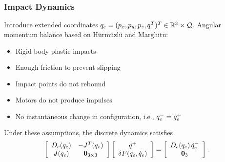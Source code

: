 \begin{frame}
  \frametitle{Impact Dynamics}
  Introduce extended coordinates $q_{e} = (p_{x}, p_{y}, p_{z}, q^{T})^{T} \in \mathbb{R}^{3} \times \mathcal{Q}$. Angular momentum balance based on H{\"u}rm{\"u}zl{\"u} and Marghitu:
  \begin{massump}
    \begin{itemize}
    \item Rigid-body plastic impacts
    \item Enough friction to prevent slipping
    \item Impact points do not rebound
    \item Motors do not produce impulses
    \item No instantaneous change in configuration, i.e., $q_{e}^{-} = q_{e}^{+}$
    \end{itemize}
  \end{massump}
  Under these assumptions, the discrete dynamics satisfies
  \begin{align*}
    \left[\begin{array}{c c}
        D_{e}(q_{e}) & -J^{T}(q_{e})\\
        J(q_{e}) & \mathbf{0}_{3 \times 3}
      \end{array}\right]
    \left[\begin{array}{c}
        \dot q^{+}\\
        \delta F(q_{e}, \dot q_{e})
      \end{array}\right]
    = \left[\begin{array}{c c}
        D_{e}(q_{e}) \, \dot q_{e}^{-}\\
        \mathbf{0}_{3}
      \end{array}\right].
  \end{align*}
\end{frame}

